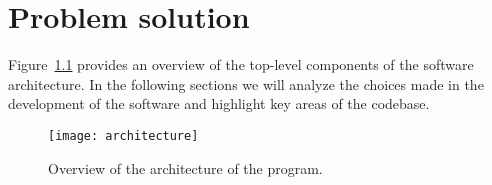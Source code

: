 \chapter{Problem solution}\label{ch:problem-solution}

Figure~\ref{fig:software-architecture} provides an overview of the top-level components of the software architecture.
In the following sections we will analyze the choices made in the development of the software and highlight key areas of
the codebase.

\begin{figure}[h]
    \centering
    \texttt{[image: architecture]}
    \caption{Overview of the architecture of the program.}\label{fig:software-architecture}
\end{figure}




